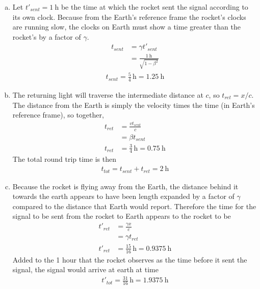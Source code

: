 \begin{enumerate}[(a)]
    \item
        Let $t'_{sent} = \SI{1}{\hour}$ be the time at which the rocket sent
        the signal according to its own clock. Because from the Earth's
        reference frame the rocket's clocks are running slow, the clocks on
        Earth must show a time greater than the rocket's by a factor of $\gamma $.
        \begin{align*}
            t_{sent} &= \gamma t'_{sent} \\
            {} &= \frac{\SI{1}{\hour}}{\sqrt{1 - \beta^2}}
        \end{align*}
        \begin{align}
            \boxed{ t_{sent} = \frac 54 \,\si{\hour} = \SI{1.25}{\hour} }
        \end{align}
    \item
        The returning light will traverse the intermediate distance at $c$, so
        $t_{ret} = x/c$. The distance from the Earth is simply the velocity
        times the time (in Earth's reference frame), so together,
        \begin{align*}
            t_{ret} &= \frac{vt_{sent}}{c} \\
            {} &= \beta t_{sent} \\
            t_{ret} &= \frac 34 \,\si{\hour} = \SI{0.75}{\hour}
        \end{align*}
        The total round trip time is then
        \begin{align}
            \boxed{ t_{tot} = t_{sent} + t_{ret} = \SI{2}{\hour} }
        \end{align}
    \item
        Because the rocket is flying away from the Earth, the distance behind
        it towards the earth appears to have been length expanded by a factor
        of $\gamma $ compared to the distance that Earth would report. Therefore the
        time for the signal to be sent from the rocket to Earth appears to the
        rocket to be
        \begin{align*}
            t'_{ret} &= \frac{\gamma x}{c} \\
            {} &= \gamma t_{ret} \\
            t'_{ret} &= \frac{15}{16} \,\si{\hour} = \SI{0.9375}{\hour}
        \end{align*}
        Added to the 1 hour that the rocket observes as the time before it
        sent the signal, the signal would arrive at earth at time
        \begin{align*}
            \boxed{ t'_{tot} = \frac{31}{16} \,\si{\hour} = \SI{1.9375}{\hour} }
        \end{align*}
\end{enumerate}
